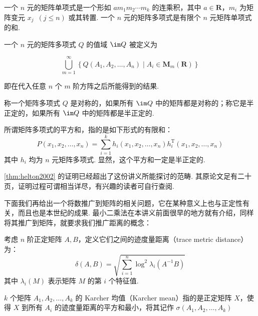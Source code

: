\begin{definition}{}{}
    一个 $n$ 元的矩阵单项式是一个形如 $am_1m_2 \cdots m_k$ 的连乘积，其中 $a \in \mathbf{R}$，$m_i$ 为矩阵变元 $x_j \enspace(j \leqslant n)$ 或其转置. 一个 $n$ 元的矩阵多项式是有限个 $n$ 元矩阵单项式的和.
\end{definition}

\begin{definition}{}{}
    一个 $n$ 元的矩阵多项式 $Q$ 的值域 $\im Q$ 被定义为

    \[ \bigcup_{m = 1}^\infty\left\{Q(A_1, A_2, \ldots, A_n) \mid A_i \in \mathbf{M}_m(\mathbf{R})\right\} \]

    即在代入任意 $n$ 个 $m$ 阶方阵之后所能得到的结果.
\end{definition}

\begin{definition}{}{}
    称一个矩阵多项式 $Q$ 是对称的，如果所有 $\im Q$ 中的矩阵都是对称的；称它是半正定的，如果所有 $\im Q$ 中的矩阵都是半正定的.
\end{definition}

\begin{definition}{}{}
    所谓矩阵多项式的平方和，指的是如下形式的有限和：
    \[ P(x_1, x_2, \ldots, x_n) = \sum_{i = 1}^k h_i(x_1, x_2, \ldots, x_n)h_i^\mathrm{T}(x_1, x_2, \ldots, x_n) \]
    其中 $h_i$ 均为 $n$ 元矩阵多项式. 显然，这个平方和一定是半正定的.
\end{definition}

\autoref{thm:helton2002} 的证明已经超出了这份讲义所能探讨的范畴. 其原论文足有二十页，证明过程可谓相当详尽，有兴趣的读者可自行查阅.

下面我们再给出一个将数推广到矩阵的相关问题，它在某种意义上也与正定性有关，而且也是本世纪的成果. 最小二乘法在本讲义前面很早的地方就有介绍，同样将其推广到矩阵，就要求我们推广距离的概念：

\begin{definition}{}{}
    考虑 $n$ 阶正定矩阵 $A, B$，定义它们之间的迹度量距离（trace metric distance）为：
    \[ \delta(A, B) = \sqrt{\sum_{i = 1}^n \log^2\lambda_i(A^{-1}B)} \]
    其中 $\lambda_i(M)$ 表示矩阵 $M$ 的第 $i$ 个特征值.
\end{definition}

\begin{definition}{}{}
    $k$ 个矩阵 $A_1, A_2, \ldots, A_k$ 的 Karcher 均值（Karcher mean）指的是正定矩阵 $X$，使得 $X$ 到所有 $A_i$ 的迹度量距离的平方和最小，将其记作 $\sigma(A_1, A_2, \ldots, A_k)$
\end{definition}

